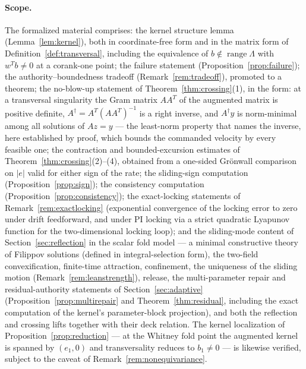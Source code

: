 \documentclass[11pt,american]{article}
\DeclareMathOperator{\range}{range}
\theoremstyle{definition}
\theoremstyle{plain}
\theoremstyle{remark}
\begin{document}
\paragraph{Scope.} The formalized material comprises: the kernel structure lemma (Lemma~\ref{lem:kernel}), both in coordinate-free form and in the matrix form of Definition~\ref{def:transversal}, including the equivalence of $b \notin \range\Lambda$ with $w^Tb \ne 0$ at a corank-one point; the failure statement (Proposition~\ref{prop:failure}); the authority--boundedness tradeoff (Remark~\ref{rem:tradeoff}), promoted to a theorem; the no-blow-up statement of Theorem~\ref{thm:crossing}(1), in the form: at a transversal singularity the Gram matrix $AA^T$ of the augmented matrix is positive definite, $A^\dagger = A^T(AA^T)^{-1}$ is a right inverse, and $A^\dagger y$ is norm-minimal among all solutions of $Az = y$ --- the least-norm property that names the inverse, here established by proof, which bounds the commanded velocity by every feasible one; the contraction and bounded-excursion estimates of Theorem~\ref{thm:crossing}(2)--(4), obtained from a one-sided Gr\"onwall comparison on $|e|$ valid for either sign of the rate; the sliding-sign computation (Proposition~\ref{prop:sign}); the consistency computation (Proposition~\ref{prop:consistency}); the exact-locking statements of Remark~\ref{rem:exactlocking} (exponential convergence of the locking error to zero under drift feedforward, and under PI locking via a strict quadratic Lyapunov function for the two-dimensional locking loop); and the sliding-mode content of Section~\ref{sec:reflection} in the scalar fold model --- a minimal constructive theory of Filippov solutions (defined in integral-selection form), the two-field convexification, finite-time attraction, confinement, the uniqueness of the sliding motion (Remark~\ref{rem:leanstrength}), release, the multi-parameter repair and residual-authority statements of Section~\ref{sec:adaptive} (Proposition~\ref{prop:multirepair} and Theorem~\ref{thm:residual}, including the exact computation of the kernel's parameter-block projection), and both the reflection and crossing lifts together with their deck relation. The kernel localization of Proposition~\ref{prop:reduction} --- at the Whitney fold point the augmented kernel is spanned by $(e_1,0)$ and transversality reduces to $b_1\ne0$ --- is likewise verified, subject to the caveat of Remark~\ref{rem:nonequivariance}.
\end{document}
